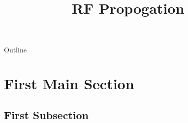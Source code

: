 \documentclass[11pt]{beamer}
\title{RF Propogation}
\institute{BITS Pilani}
\begin{document}
\begin{frame}
\maketitle
\end{frame}
\begin{frame}{Outline}
  \tableofcontents
\end{frame}

\section{First Main Section}

\subsection{First Subsection}
\end{document}
